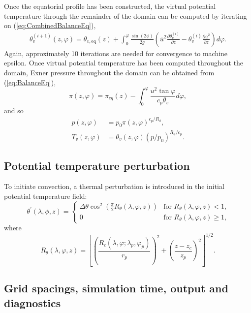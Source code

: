 \documentclass[times,doublespace]{fldauth}
\newcommand{\pdiff}[2]{\frac{\partial #1}{\partial #2}}
\begin{document}
{Once the equatorial profile has been constructed, the virtual potential temperature through the remainder of the domain can be computed by iterating on (\ref{eq:CombinedBalanceEq}),
\begin{align}
\theta_v^{(i+1)}(z,\varphi) = \theta_{v,\text{eq}}(z) + \int_{0}^{\varphi} \frac{\sin(2 \phi)}{2 g} \left(\overline{u}^2 \pdiff{\theta_{v}^{(i)}}{z} - \theta_v^{(i)} \pdiff{\overline{u}^2}{z} \right) d\varphi.
\end{align}  Again, approximately 10 iterations are needed for convergence to machine epsilon.  Once virtual potential temperature has been computed throughout the domain, Exner pressure throughout the domain can be obtained from (\ref{eq:BalanceEq}),
\begin{equation}
\pi(z,\varphi) = \pi_{eq}(z) - \int_{0}^{\varphi} \frac{u^2 \tan \varphi}{c_p \theta_v} d\varphi,
\end{equation} and so
\begin{align}
p(z,\varphi) &= p_0 \pi(z,\varphi)^{c_p / R_d}, \\
T_v(z,\varphi) &= \theta_v(z,\varphi) (p / p_0)^{R_d / c_p}.
\end{align}

\subsection{Potential temperature perturbation}

To initiate convection, a thermal perturbation is introduced in the initial potential temperature field:
\begin{equation}
\theta^\prime(\lambda,\phi,z) = \left\{ \begin{array}{ll} \displaystyle \Delta \theta \cos^2\left(\frac{\pi}{2}R_{\theta}(\lambda, \varphi, z)\right) & \mbox{for $R_{\theta}(\lambda, \varphi, z) < 1$,} \\[2.0ex]
0 & \mbox{for $R_{\theta}(\lambda, \varphi, z) \geq 1$,} \end{array} \right.
\end{equation} where
\begin{equation}
R_{\theta}(\lambda, \varphi, z) = \left[ \left( \frac{R_c(\lambda, \varphi; \lambda_p, \varphi_p)}{r_p} \right)^2 + \left( \frac{z - z_c}{z_p} \right)^2 \right]^{1/2}.
\end{equation}

\subsection{Grid spacings, simulation time, output and diagnostics}

}
\end{document}

